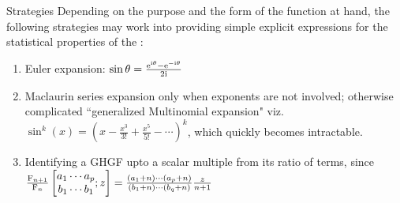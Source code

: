 \documentclass{beamer}
\begin{document}
\begin{frame}[allowframebreaks]{Strategies}
	Depending on the purpose and the form of the function at hand, the following strategies may work into providing simple explicit expressions for the statistical properties of the \sindist:
	\begin{enumerate}
		\item Euler expansion: $\sin \theta = \frac{\mathrm e^{\mathrm i\theta}-\mathrm e^{-\mathrm i\theta}}{2\mathrm i}$
		\item Maclaurin series expansion only when exponents are not involved; otherwise complicated ``generalized Multinomial expansion" viz. $\sin^k(x) = \left(x - \frac{x^3}{3!} + \frac{x^5}{5!}- \cdots \right)^k$, which quickly becomes intractable.
		\item Identifying a GHGF upto a scalar multiple from its ratio of terms, since $\frac{\operatorname{F}_{n+1}}{\operatorname{F}_n} \left[ \begin{matrix} a_1 \cdots a_p \\ b_1 \cdots b_1 \end{matrix}; z \right] = \frac{(a_1 + n) \cdots (a_p +n)}{(b_1 +n)\cdots(b_q +n)} \frac{z}{n+1}$
	\end{enumerate}
\end{frame}
\end{document}
